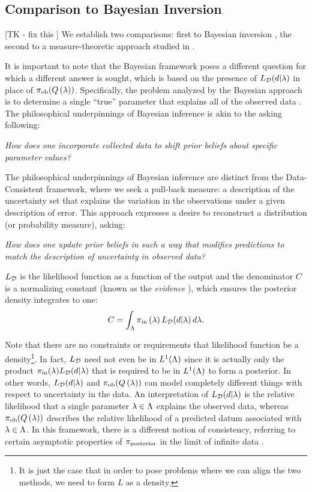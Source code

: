 \subsection{Comparison to Bayesian Inversion}\label{sec:bayesian}
[TK - fix this ] We establish two comparisons: first to Bayesian inversion \cite{Walpole, Berger, Complete, Smith}, the second to a measure-theoretic approach studied in \cite{BET+14, BE13}.

It is important to note that the Bayesian framework poses a different question for which a different answer is sought, which is based on the presence of $L_{\mathcal{D}}(d | \lambda)$ in place of $\operatorname*{\pi_{ob}}(Q\left ( \lambda \right ))$.
Specifically, the problem analyzed by the Bayesian approach is to determine a single ``true'' parameter that explains all of the observed data \cite{Smith, Concrete, Complete}.
The philosophical underpinnings of Bayesian inference is akin to the asking following:

\begin{center}
  \emph{How does one incorporate collected data to shift prior beliefs about specific parameter values?}
\end{center}

The philosophical underpinnings of Bayesian inference are distinct from the Data-Consistent framework, where we seek a pull-back measure: a description of the uncertainty set that explains the variation in the observations under a given description of error.
This approach expresses a desire to reconstruct a distribution (or probability measure), asking:

\begin{center}
  \emph{How does one update prior beliefs in such a way that modifies predictions to match the description of uncertainty in observed data?}
\end{center}


$L_{\mathcal{D}}$ is the likelihood function as a function of the output and the denominator $C$ is a normalizing constant (known as the \emph{evidence} \cite{Smith}), which ensures the posterior density integrates to one:
\[
C = \int_{\Lambda} \operatorname*{\pi_{in}}\left ( \lambda \right ) L_{\mathcal{D}}(d | \lambda) \, d\lambda.
\]

Note that there are no constraints or requirements that likelihood function be a density\footnote{It is just the case that in order to pose problems where we can align the two methods, we need to form $L$ as a density.}.
In fact, $L_{\mathcal{D}}$ need not even be in $L^1({\Lambda})$ since it is actually only the product $\operatorname*{\pi_{in}}(\lambda) L_{\mathcal{D}} (d | \lambda)$ that is required to be in $L^1({\Lambda})$ to form a posterior.
In other words, $L_{\mathcal{D}} (d | \lambda)$ and $\operatorname*{\pi_{ob}}(Q\left ( \lambda \right ))$ can model completely different things with respect to uncertainty in the data.
An interpretation of $L_{\mathcal{D}} (d | \lambda)$ is the relative likelihood that a single parameter $\lambda\in{\Lambda}$ explains the observed data, whereas $\operatorname*{\pi_{ob}}(Q\left ( \lambda \right ))$ describes the relative likelihood of a predicted datum associated with $\lambda\in{\Lambda}$.
In this framework, there is a different notion of consistency, referring to certain asymptotic properties of $\operatorname*{\pi_{posterior}}$ in the limit of infinite data \cite{Barron, Silverman}.



